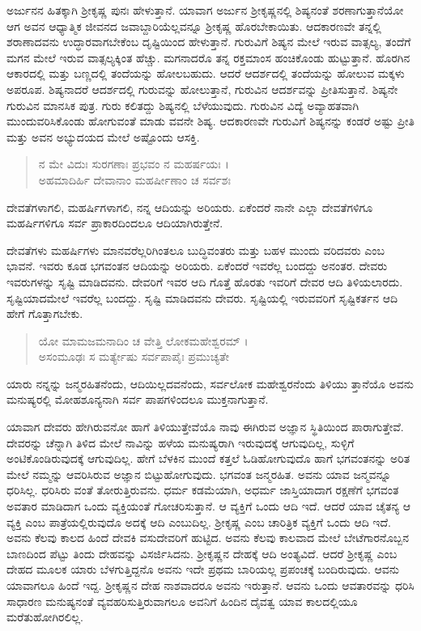 ಅರ್ಜುನನ ಹಿತಕ್ಕಾಗಿ ಶ್ರೀಕೃಷ್ಣ ಪುನಃ ಹೇಳುತ್ತಾನೆ. ಯಾವಾಗ ಅರ್ಜುನ ಶ್ರೀಕೃಷ್ಣನಲ್ಲಿ ಶಿಷ್ಯನಂತೆ ಶರಣಾಗುತ್ತಾನೆಯೋ ಆಗ ಅವನ ಆಧ್ಯಾತ್ಮಿಕ ಜೀವನದ ಜವಾಬ್ದಾರಿಯೆಲ್ಲವನ್ನೂ ಶ್ರೀಕೃಷ್ಣ ಹೊರಬೇಕಾಯಿತು. ಆದಕಾರಣವೇ ತನ್ನಲ್ಲಿ ಶರಾಣಾದವನು ಉದ್ಧಾರವಾಗಬೇಕೆಂಬ ದೃಷ್ಟಿಯಿಂದ ಹೇಳುತ್ತಾನೆ. ಗುರುವಿಗೆ ಶಿಷ್ಯನ ಮೇಲೆ ಇರುವ ವಾತ್ಸಲ್ಯ, ತಂದೆಗೆ ಮಗನ ಮೇಲೆ ಇರುವ ವಾತ್ಸಲ್ಯಕ್ಕಿಂತ ಹೆಚ್ಚು. ಮಗನಾದರೊ ತನ್ನ ರಕ್ತಮಾಂಸ ಹಂಚಿಕೊಂಡು ಹುಟ್ಟುತ್ತಾನೆ. ಹೊರಗಿನ ಆಕಾರದಲ್ಲಿ ಮತ್ತು ಬಣ್ಣದಲ್ಲಿ ತಂದೆಯನ್ನು ಹೋಲಬಹುದು. ಆದರೆ ಆದರ್ಶದಲ್ಲಿ ತಂದೆಯನ್ನು ಹೋಲುವ ಮಕ್ಕಳು ಅಪರೂಪ. ಶಿಷ್ಯನಾದರೆ ಆದರ್ಶದಲ್ಲಿ ಗುರುವನ್ನು ಹೋಲುತ್ತಾನೆ, ಗುರುವಿನ ಆದರ್ಶವನ್ನು ಪ್ರೀತಿಸುತ್ತಾನೆ. ಶಿಷ್ಯನೇ ಗುರುವಿನ ಮಾನಸಿಕ ಪುತ್ರ. ಗುರು ಕಲಿತದ್ದು ಶಿಷ್ಯನಲ್ಲಿ ಬೆಳೆಯುವುದು. ಗುರುವಿನ ವಿದ್ಯೆ ಅವ್ಯಾಹತವಾಗಿ ಮುಂದುವರಿಸಿಕೊಂಡು ಹೋಗುವಂತೆ ಮಾಡು ವವನೇ ಶಿಷ್ಯ. ಆದಕಾರಣವೇ ಗುರುವಿಗೆ ಶಿಷ್ಯನನ್ನು ಕಂಡರೆ ಅಷ್ಟು ಪ್ರೀತಿ ಮತ್ತು ಅವನ ಅಭ್ಯುದಯದ ಮೇಲೆ ಅಷ್ಟೊಂದು ಆಸಕ್ತಿ.

\begin{verse}
ನ ಮೇ ವಿದುಃ ಸುರಗಣಾಃ ಪ್ರಭವಂ ನ ಮಹರ್ಷಯಃ ।\\ಅಹಮಾದಿರ್ಹಿ ದೇವಾನಾಂ ಮಹರ್ಷೀಣಾಂ ಚ ಸರ್ವಶಃ 
\end{verse}

{\small ದೇವತೆಗಳಾಗಲಿ, ಮಹರ್ಷಿಗಳಾಗಲಿ, ನನ್ನ ಆದಿಯನ್ನು ಅರಿಯರು. ಏಕೆಂದರೆ ನಾನೇ ಎಲ್ಲಾ ದೇವತೆಗಳಿಗೂ ಮಹರ್ಷಿಗಳಿಗೂ ಸರ್ವ ಪ್ರಾಕಾರದಿಂದಲೂ ಆದಿಯಾಗಿರುತ್ತೇನೆ.}

ದೇವತೆಗಳು ಮಹರ್ಷಿಗಳು ಮಾನವರೆಲ್ಲರಿಗಿಂತಲೂ ಬುದ್ಧಿವಂತರು ಮತ್ತು ಬಹಳ ಮುಂದು ವರಿದವರು ಎಂಬ ಭಾವನೆ. ಇವರು ಕೂಡ ಭಗವಂತನ ಆದಿಯನ್ನು ಅರಿಯರು. ಏಕೆಂದರೆ ಇವರೆಲ್ಲ ಬಂದದ್ದು ಅನಂತರ. ದೇವರು ಇವರುಗಳನ್ನು ಸೃಷ್ಟಿ ಮಾಡಿದವನು. ದೇವರಿಗೆ ಇವರ ಆದಿ ಗೊತ್ತೆ ಹೊರತು ಇವರಿಗೆ ದೇವರ ಆದಿ ತಿಳಿಯಲಾರದು. ಸೃಷ್ಟಿಯಾದಮೇಲೆ ಇವರೆಲ್ಲ ಬಂದದ್ದು. ಸೃಷ್ಟಿ ಮಾಡಿದವನು ದೇವರು. ಸೃಷ್ಟಿಯಲ್ಲಿ ಇರುವವರಿಗೆ ಸೃಷ್ಟಿಕರ್ತನ ಆದಿ ಹೇಗೆ ಗೊತ್ತಾಗಬೇಕು.

\begin{verse}
ಯೋ ಮಾಮಜಮನಾದಿಂ ಚ ವೇತ್ತಿ ಲೋಕಮಹೇಶ್ವರಮ್ ।\\ಅಸಂಮೂಢಃ ಸ ಮರ್ತ್ಯೇಷು ಸರ್ವಪಾಪೈಃ ಪ್ರಮುಚ್ಯತೇ 
\end{verse}

{\small ಯಾರು ನನ್ನನ್ನು ಜನ್ಮರಹಿತನೆಂದು, ಆದಿಯಿಲ್ಲದವನೆಂದು, ಸರ್ವಲೋಕ ಮಹೇಶ್ವರನೆಂದು ತಿಳಿಯು ತ್ತಾನೆಯೊ ಅವನು ಮನುಷ್ಯರಲ್ಲಿ ಮೋಹಶೂನ್ಯನಾಗಿ ಸರ್ವ ಪಾಪಗಳಿಂದಲೂ ಮುಕ್ತನಾಗುತ್ತಾನೆ.}

ಯಾವಾಗ ದೇವರು ಹೇಗಿರುವನೋ ಹಾಗೆ ತಿಳಿಯುತ್ತೇವೆಯೊ ನಾವು ಈಗಿರುವ ಅಜ್ಞಾನ ಸ್ಥಿತಿಯಿಂದ ಪಾರಾಗುತ್ತೇವೆ. ದೇವರನ್ನು ಚೆನ್ನಾಗಿ ತಿಳಿದ ಮೇಲೆ ನಾವಿನ್ನು ಹಳೆಯ ಮನುಷ್ಯರಾಗಿ ಇರುವುದಕ್ಕೆ ಆಗುವುದಿಲ್ಲ, ಸುಳ್ಳಿಗೆ ಅಂಟಿಕೊಂಡಿರುವುದಕ್ಕೆ ಆಗುವುದಿಲ್ಲ. ಹೇಗೆ ಬೆಳಕಿನ ಮುಂದೆ ಕತ್ತಲೆ ಓಡಿಹೋಗುವುದೊ ಹಾಗೆ ಭಗವಂತನನ್ನು ಅರಿತ ಮೇಲೆ ನಮ್ಮನ್ನು ಆವರಿಸಿರುವ ಅಜ್ಞಾನ ಬಿಟ್ಟುಹೋಗುವುದು. ಭಗವಂತ ಜನ್ಮರಹಿತ. ಅವನು ಯಾವ ಜನ್ಮವನ್ನೂ ಧರಿಸಿಲ್ಲ. ಧರಿಸಿರು ವಂತೆ ತೋರುತ್ತಿರುವನು. ಧರ್ಮ ಕಡಮೆಯಾಗಿ, ಅಧರ್ಮ ಜಾಸ್ತಿಯಾದಾಗ ರಕ್ಷಣೆಗೆ ಭಗವಂತ ಅವತಾರ ಮಾಡಿದಾಗ ಒಂದು ವ್ಯಕ್ತಿಯಂತೆ ಗೋಚರಿಸುತ್ತಾನೆ. ಆ ವ್ಯಕ್ತಿಗೆ ಒಂದು ಆದಿ ಇದೆ. ಆದರೆ ಯಾವ ಚೈತನ್ಯ ಆ ವ್ಯಕ್ತಿ ಎಂಬ ಪಾತ್ರೆಯಲ್ಲಿರುವುದೊ ಅದಕ್ಕೆ ಆದಿ ಎಂಬುದಿಲ್ಲ. ಶ್ರೀಕೃಷ್ಣ ಎಂಬ ಚಾರಿತ್ರಿಕ ವ್ಯಕ್ತಿಗೆ ಒಂದು ಆದಿ ಇದೆ. ಅವನು ಕೆಲವು ಕಾಲದ ಹಿಂದೆ ದೇವಕಿ ವಸುದೇವರಿಗೆ ಹುಟ್ಟಿದ. ಅವನು ಕೆಲವು ಕಾಲವಾದ ಮೇಲೆ ಬೇಟೆಗಾರನೊಬ್ಬನ ಬಾಣದಿಂದ ಪೆಟ್ಟು ತಿಂದು ದೇಹವನ್ನು ವಿಸರ್ಜಿಸಿದನು. ಶ್ರೀಕೃಷ್ಣನ ದೇಹಕ್ಕೆ ಆದಿ ಅಂತ್ಯವಿದೆ. ಆದರೆ ಶ್ರೀಕೃಷ್ಣ ಎಂಬ ದೇಹದ ಮೂಲಕ ಯಾರು ಬೆಳಗುತ್ತಿದ್ದನೊ ಅವನು ಇದೇ ಪ್ರಥಮ ಬಾರಿಯಲ್ಲ ಪ್ರಪಂಚಕ್ಕೆ ಬಂದಿರುವುದು. ಆವನು ಯಾವಾಗಲೂ ಹಿಂದೆ ಇದ್ದ. ಶ್ರೀಕೃಷ್ಣನ ದೇಹ ನಾಶವಾದರೂ ಅವನು ಇರುತ್ತಾನೆ. ಆವನು ಒಂದು ಆವತಾರವನ್ನು ಧರಿಸಿ ಸಾಧಾರಣ ಮನುಷ್ಯನಂತೆ ವ್ಯವಹರಿಸುತ್ತಿರುವಾಗಲೂ ಅವನಿಗೆ ಹಿಂದಿನ ದೈವತ್ವ ಯಾವ ಕಾಲದಲ್ಲಿಯೂ ಮರೆತುಹೋಗಿರಲಿಲ್ಲ.


